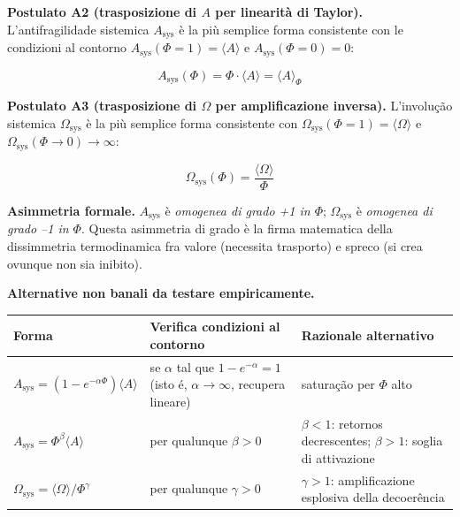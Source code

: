 \Hypoth{} \textbf{Postulato A2 (trasposizione di \(A\) per linearità di
Taylor).} L'antifragilidade sistemica \(A_{\text{sys}}\) è la più semplice
forma consistente con le condizioni al contorno
\(A_{\text{sys}}(\Phi=1) = \langle A\rangle\) e
\(A_{\text{sys}}(\Phi=0) = 0\):

\[
A_{\text{sys}}(\Phi) = \Phi \cdot \langle A \rangle = \langle A \rangle_\Phi
\]

\Hypoth{} \textbf{Postulato A3 (trasposizione di \(\Omega\) per
amplificazione inversa).} L'involução sistemica
\(\Omega_{\text{sys}}\) è la più semplice forma consistente con
\(\Omega_{\text{sys}}(\Phi=1) = \langle\Omega\rangle\) e
\(\Omega_{\text{sys}}(\Phi \to 0) \to \infty\):

\[
\Omega_{\text{sys}}(\Phi) = \frac{\langle \Omega \rangle}{\Phi}
\]

\Proved{} \textbf{Asimmetria formale.} \(A_{\text{sys}}\) è
\emph{omogenea di grado +1 in \(\Phi\)}; \(\Omega_{\text{sys}}\) è
\emph{omogenea di grado --1 in \(\Phi\)}. Questa asimmetria di grado è la
firma matematica della dissimmetria termodinamica fra valore (necessita
trasporto) e spreco (si crea ovunque non sia inibito).

\Conj{} \textbf{Alternative non banali da testare empiricamente.}

{\def\LTcaptype{none} %
{\small\begin{longtable}[]{@{}
  >{\raggedright\arraybackslash}p{}
  >{\raggedright\arraybackslash}p{}
  >{\raggedright\arraybackslash}p{}@{}}
\toprule\noalign{}
\begin{minipage}[b]{\linewidth}\raggedright
Forma
\end{minipage} & \begin{minipage}[b]{\linewidth}\raggedright
Verifica condizioni al contorno
\end{minipage} & \begin{minipage}[b]{\linewidth}\raggedright
Razionale alternativo
\end{minipage} \\
\midrule\noalign{}
\endhead
\bottomrule\noalign{}
\endlastfoot
\(A_{\text{sys}} = (1 - e^{-\alpha\Phi})\langle A\rangle\) & \Proved{}
se \(\alpha\) tal que \(1-e^{-\alpha} = 1\) (isto é,
\(\alpha \to \infty\), recupera lineare) & saturação per \(\Phi\)
alto \\
\(A_{\text{sys}} = \Phi^\beta \langle A\rangle\) & \Proved{} per
qualunque \(\beta > 0\) & \(\beta < 1\): retornos decrescentes;
\(\beta > 1\): soglia di attivazione \\
\(\Omega_{\text{sys}} = \langle\Omega\rangle / \Phi^\gamma\) & \Proved{}
per qualunque \(\gamma > 0\) & \(\gamma > 1\): amplificazione esplosiva
della decoerência \\
\end{longtable}}
}

